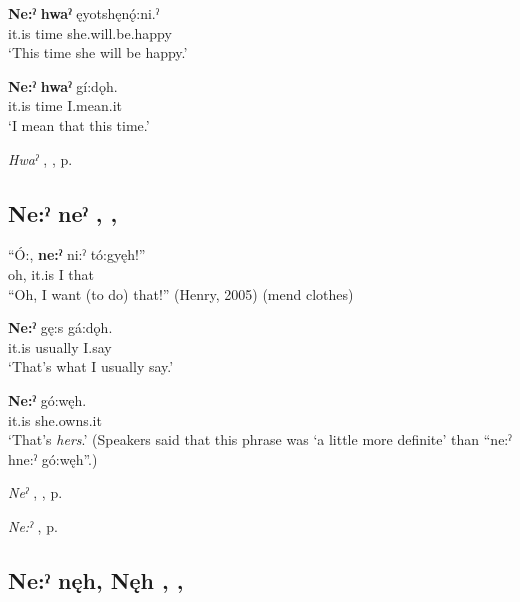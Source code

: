 \ea
\label{ex:npar86}
\gll \textbf{Ne:ˀ} \textbf{hwaˀ} ęyotshęnǫ́:ni.ˀ \\
it.is time she.will.be.happy\\
\glt ‘This time she will be happy.’
\z

\ea
\label{ex:npar87}
\gll \textbf{Ne:ˀ} \textbf{hwaˀ} gí:dǫh.\\
it.is time I.mean.it\\
\glt ‘I mean that this time.’
\z

\begin{CayugaRelated}
\item \textit{Hwaˀ} , , p. \pageref{p:[hwaˀ]}
\end{CayugaRelated}

\subsection*{\textbf{Ne:ˀ neˀ} , , } \label{p:[ne:ˀ neˀ]}

\ea
\label{ex:npar82}
\gll “Ó:, \textbf{ne:ˀ} ni:ˀ tó:gyęh!” \\
oh, it.is I that\\
\glt “Oh, I want (to do) that!” (Henry, 2005) (mend clothes) 
\z


\ea
\label{ex:npar83}
\gll \textbf{Ne:ˀ} gę:s gá:dǫh. \\
it.is usually I.say\\
\glt ‘That’s what I usually say.’
\z

\ea
\label{ex:npar84}
\gll \textbf{Ne:ˀ} gó:węh. \\
it.is she.owns.it\\
\glt ‘That’s \emph{hers}.’ (Speakers said that this phrase was ‘a little more definite’ than “ne:ˀ hne:ˀ gó:węh”.)
\z

\begin{CayugaRelated}
\item \textit{Neˀ} , , p. \pageref{p:[neˀ]}\\
\item \textit{Ne:ˀ} , p. \pageref{p:[ne:ˀ] `it is’}
\end{CayugaRelated}


\subsection*{\textbf{Ne:ˀ nęh, Nęh} , , } \label{p:[ne:ˀ nęh, nęh]}

